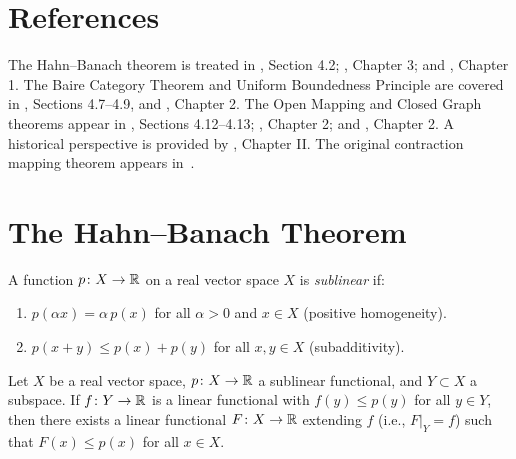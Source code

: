 \documentclass[11pt,a4paper]{article}
\begin{document}
\section{References}
\label{sec:references}

The Hahn--Banach theorem is treated in \citet{kreyszig1989},
Section 4.2; \citet{rudin1991}, Chapter 3; and \citet{brezis2011},
Chapter 1. The Baire Category Theorem and Uniform Boundedness Principle
are covered in \citet{kreyszig1989}, Sections 4.7--4.9, and
\citet{rudin1991}, Chapter 2. The Open Mapping and Closed Graph theorems
appear in \citet{kreyszig1989}, Sections 4.12--4.13;
\citet{brezis2011}, Chapter 2; and \citet{rudin1991}, Chapter 2.
A historical perspective is provided by \citet{dunford1988}, Chapter II.
The original contraction mapping theorem appears
in~\citet{banach1922}.


\section{The Hahn--Banach Theorem}
\label{sec:hahn-banach}

\begin{definition}
\label{def:sublinear}
A function $p \colon X \to \mathbb{R}$ on a real vector space $X$ is
\emph{sublinear} if:
\begin{enumerate}[label=(\roman*)]
    \item $p(\alpha x) = \alpha\, p(x)$ for all $\alpha > 0$ and
          $x \in X$ (positive homogeneity).
    \item $p(x + y) \leq p(x) + p(y)$ for all $x, y \in X$
          (subadditivity).
\end{enumerate}
\end{definition}

\begin{theorem}
\label{thm:hahn-banach}
Let $X$ be a real vector space, $p \colon X \to \mathbb{R}$ a sublinear
functional, and $Y \subset X$ a subspace. If $f \colon Y \to \mathbb{R}$ is a
linear functional with $f(y) \leq p(y)$ for all $y \in Y$, then there
exists a linear functional $F \colon X \to \mathbb{R}$ extending $f$ (i.e.,
$F|_Y = f$) such that $F(x) \leq p(x)$ for all $x \in X$.
\end{theorem}
\end{document}
